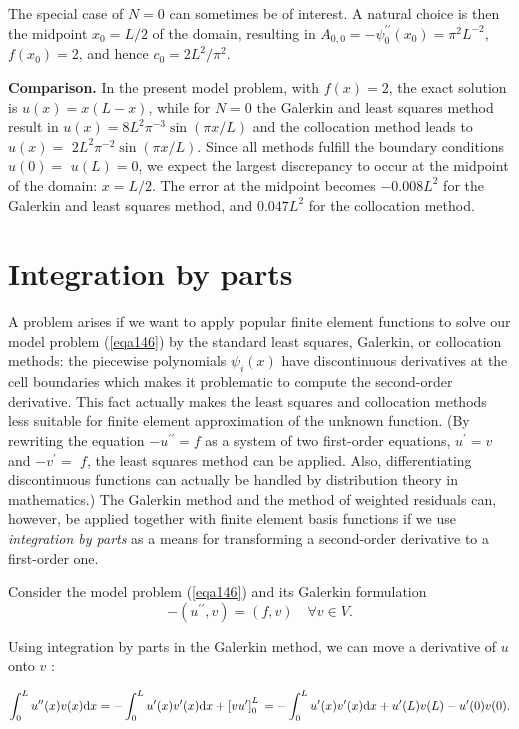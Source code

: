 \documentclass[../main.tex]{subfiles}
\begin{document}
	The special case of $N=0$ can sometimes be of interest. A natural choice is then the midpoint $x_{0}=L / 2$ of the domain, resulting in $A_{0,0}=-\psi_{0}^{\prime \prime}\left(x_{0}\right)=\pi^{2} L^{-2}$, $f\left(x_{0}\right)=2$, and hence $c_{0}=2 L^{2} / \pi^{2} .$ \bigbreak
	
	\noindent \textbf{Comparison.} In the present model problem, with $f(x)=2$, the exact solution is $u(x)=x(L-x)$, while for $N=0$ the Galerkin and least squares method result in $u(x)=8 L^{2} \pi^{-3} \sin (\pi x / L)$ and the collocation method leads to $u(x)=$ $2 L^{2} \pi^{-2} \sin (\pi x / L)$. Since all methods fulfill the boundary conditions $u(0)=$ $u(L)=0$, we expect the largest discrepancy to occur at the midpoint of the domain: $x=L / 2$. The error at the midpoint becomes $-0.008 L^{2}$ for the Galerkin and least squares method, and $0.047 L^{2}$ for the collocation method. \bigbreak 

\section[Integration by parts]{Integration by parts} 
	\label{sec:sec_11_10}
	\noindent A problem arises if we want to apply popular finite element functions to solve our model problem (\ref{eqa146}) by the standard least squares, Galerkin, or collocation methods: the piecewise polynomials $\psi_{i}(x)$ have discontinuous derivatives at the cell boundaries which makes it problematic to compute the second-order derivative. This fact actually makes the least squares and collocation methods less suitable for finite element approximation of the unknown function. (By rewriting the equation $-u^{\prime \prime}=f$ as a system of two first-order equations, $u^{\prime}=v$ and $-v^{\prime}=$ $f$, the least squares method can be applied. Also, differentiating discontinuous functions can actually be handled by distribution theory in mathematics.) The Galerkin method and the method of weighted residuals can, however, be applied together with finite element basis functions if we use \emph{integration by parts} as a means for transforming a second-order derivative to a first-order one.
	
	Consider the model problem (\ref{eqa146}) and its Galerkin formulation
	$$ -\left(u^{\prime \prime}, v\right)=(f, v) \quad \forall v \in V . $$
	
	\noindent Using integration by parts in the Galerkin method, we can move a derivative of $u$ onto $v$ :
	
	\begin{equation}
		\label{eqa161}
		\int_{0}^{L} u^{\prime \prime}(x) v(x) \mathrm{d} x =-\int_{0}^{L} u^{\prime}(x) v^{\prime}(x) \mathrm{d} x+\left[v u^{\prime}\right]_{0}^{L} \\
		=-\int_{0}^{L} u^{\prime}(x) v^{\prime}(x) \mathrm{d} x+u^{\prime}(L) v(L)-u^{\prime}(0) v(0) .
	\end{equation}
	
\end{document}
